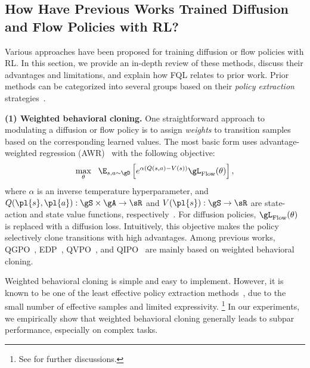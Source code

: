 \subsection{How Have Previous Works Trained Diffusion and Flow Policies with RL?}
\label{sec:prev_solutions}

%


%
%
%
%
%

Various approaches have been proposed for training diffusion or flow policies with RL.
In this section, we provide an in-depth review of these methods, discuss their advantages and limitations,
and explain how FQL relates to prior work.
Prior methods can be categorized into several groups based on their \emph{policy extraction} strategies~\citep{bottleneck_park2024}.

%
%
%
%
%
%

%
%
%
%
%
%
%
%

%

\textbf{(1) Weighted behavioral cloning.}
One straightforward approach to modulating a diffusion or flow policy is
to assign \emph{weights} to transition samples based on the corresponding learned values. 
The most basic form uses advantage-weighted regression (AWR)~\citep{rwr_peters2007, awr_peng2019, awac_nair2020}
with the following objective:
\begin{align}
    \max_\theta \ \ \E_{s, a \sim \gD}\left[e^{\alpha(Q(s, a) - V(s))} \gL_\mathrm{Flow}(\theta)\right],
    \label{eq:flow_awr}
\end{align}
where $\alpha$ is an inverse temperature hyperparameter,
and $Q(\pl{s}, \pl{a}): \gS \times \gA \to \sR$ and $V(\pl{s}): \gS \to \sR$ are
state-action and state value functions, respectively~\citep{rl_sutton2005}.
For diffusion policies, $\gL_\mathrm{Flow}(\theta)$ is replaced with a diffusion loss.
Intuitively, this objective makes the policy selectively clone transitions with high advantages.
Among previous works, 
QGPO~\citep{qgpo_lu2023},
EDP~\citep{edp_kang2023},
QVPO~\citep{qvpo_ding2024},
and QIPO~\citep{qipo_anon2025} are mainly based on weighted behavioral cloning.

Weighted behavioral cloning is simple and easy to implement.
However, it is known to be one of the least effective policy extraction methods~\citep{closer_fu2022, bottleneck_park2024},
due to the small number of effective samples and limited expressivity.%
%
\footnote{See \citet{bottleneck_park2024} for further discussions.}
In our experiments, we empirically show that weighted behavioral cloning
generally leads to subpar performance, especially on complex tasks.

